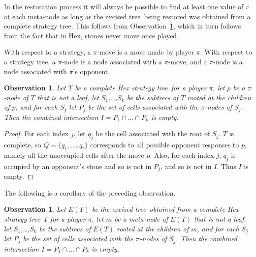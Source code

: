 \documentclass{llncs}
\def\stt{strategy tree}
\def\exct{excised tree}
\newtheorem{observation}[theorem]{Observation}
\begin{document}
In the restoration process it will always be possible
to find at least one value of $r$ at each meta-node
as long as the \exct\ being restored was obtained
from a complete strategy tree.
This follows from Observation~\ref{obs1},
which in turn follows from the fact that in Hex, 
stones never move once played.

With respect to a strategy, a $\pi$-move is a move made by player $\pi$.
With respect to a strategy tree,
a $\pi$-node is a node associated with a $\pi$-move,
and a $\overline{\pi}$-node is a node associated with $\pi$'s opponent.

\begin{observation}\label{obs1}
Let $T$ be a complete Hex \stt\ for a player $\pi$,
let $p$ be a $\pi$-node of $T$ that is not a leaf,
let $S_1$,\ldots,$S_k$ be the subtrees of $T$ rooted at the children of $p$,
and for each $S_j$ let $P_j$ be the set of 
cells associated with the $\pi$-nodes of $S_j$.
Then the combined intersection $I=P_1\cap \ldots \cap P_k$ is empty.
\end{observation}

\begin{proof}
For each index $j$, let $q_j$ be 
the cell associated with the root of $S_j$.
$T$ is complete, so $Q=\{q_1,\ldots,q_t\}$ corresponds to all possible
opponent responses to $p$,
namely all the unoccupied cells after the move $p$.
Also, for each index $j$, $q_j$ is occupied by an opponent's stone
and so is not in $P_j$, and so is not in $I$.
Thus $I$ is empty.
\end{proof}

The following is a corollary of the preceding observation.

\begin{observation}\label{obs:elusive}
Let $E(T)$ be the \exct\ obtained from 
a complete Hex \stt\ $T$ for a player $\pi$,
let $m$ be a meta-node of $E(T)$ that is not a leaf,
let $S_1$,\ldots,$S_k$ be the subtrees of $E(T)$ rooted at the children of $m$,
and for each $S_j$ let $P_j$ be the set of 
cells associated with the $\pi$-nodes of $S_j$.
Then the combined intersection $I=P_1\cap \ldots \cap P_k$ is empty.
\end{observation}

\end{document}
